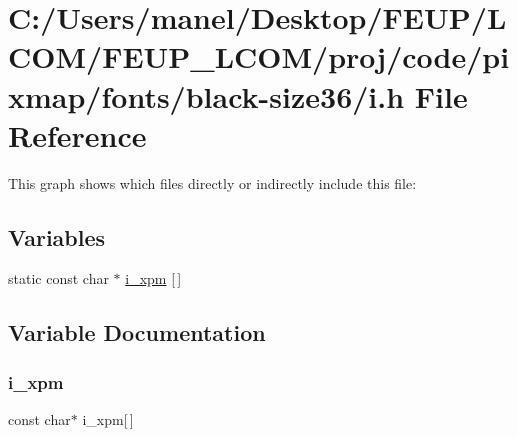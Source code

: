 \hypertarget{black-size36_2i_8h}{}\section{C\+:/\+Users/manel/\+Desktop/\+F\+E\+U\+P/\+L\+C\+O\+M/\+F\+E\+U\+P\+\_\+\+L\+C\+O\+M/proj/code/pixmap/fonts/black-\/size36/i.h File Reference}
\label{black-size36_2i_8h}
This graph shows which files directly or indirectly include this file\+:
\subsection*{Variables}
\begin{DoxyCompactItemize}
\item 
static const char $\ast$ \mbox{\hyperlink{black-size36_2i_8h_abf5f011ea851b6395f388125b76fd147}{i\+\_\+xpm}} \mbox{[}$\,$\mbox{]}
\end{DoxyCompactItemize}


\subsection{Variable Documentation}
\mbox{\label{black-size36_2i_8h_abf5f011ea851b6395f388125b76fd147}} 
\subsubsection{\texorpdfstring{i\_xpm}{i\_xpm}}
{\footnotesize\ttfamily const char$\ast$ i\+\_\+xpm\mbox{[}$\,$\mbox{]}\hspace{0.3cm}{\ttfamily [static]}}

